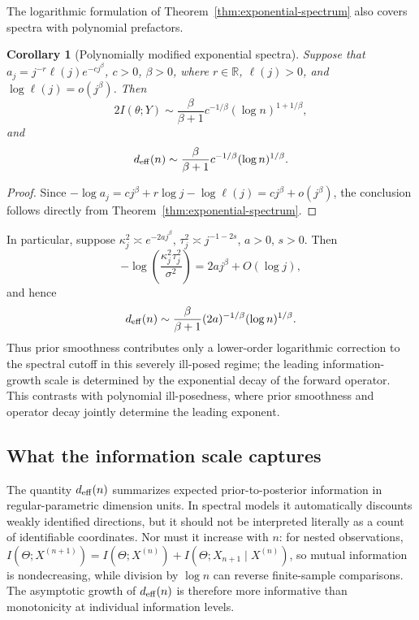\documentclass[11pt]{article}
\theoremstyle{plain}
\newtheorem{corollary}{Corollary}
\theoremstyle{definition}
\theoremstyle{remark}
\begin{document}
The logarithmic formulation of Theorem~\ref{thm:exponential-spectrum} also covers spectra with polynomial prefactors.

\begin{corollary}[Polynomially modified exponential spectra]
	\label{cor:poly-exponential}
	Suppose that \(a_j=j^{-r}\ell(j)e^{-cj^\beta}\), \(c>0\), \(\beta>0\), where \(r\in\mathbb R\), \(\ell(j)>0\), and \(\log\ell(j)=o(j^\beta)\). Then
	\[
	2I(\theta;Y)
	\sim
	\frac{\beta}{\beta+1}c^{-1/\beta}(\log n)^{1+1/\beta},
	\]
	and
	\[
	d_{\rm eff}(n)
	\sim
	\frac{\beta}{\beta+1}c^{-1/\beta}(\log n)^{1/\beta}.
	\]
\end{corollary}

\begin{proof}
	Since \(-\log a_j=cj^\beta+r\log j-\log\ell(j)=cj^\beta+o(j^\beta)\), the conclusion follows directly from Theorem~\ref{thm:exponential-spectrum}.
\end{proof}

In particular, suppose \(\kappa_j^2\asymp e^{-2aj^\beta}\), \(\tau_j^2\asymp j^{-1-2s}\), \(a>0\), \(s>0\). Then
\[
-\log\left(\frac{\kappa_j^2\tau_j^2}{\sigma^2}\right)
=
2aj^\beta+O(\log j),
\]
and hence
\[
d_{\rm eff}(n)
\sim
\frac{\beta}{\beta+1}(2a)^{-1/\beta}(\log n)^{1/\beta}.
\]
Thus prior smoothness contributes only a lower-order logarithmic correction to the spectral cutoff in this severely ill-posed regime; the leading information-growth scale is determined by the exponential decay of the forward operator. This contrasts with polynomial ill-posedness, where prior smoothness and operator decay jointly determine the leading exponent.

\subsection{What the information scale captures}
\label{subsec:interpretation}

The quantity \(d_{\rm eff}(n)\) summarizes expected prior-to-posterior information in regular-parametric dimension units. In spectral models it automatically discounts weakly identified directions, but it should not be interpreted literally as a count of identifiable coordinates. Nor must it increase with \(n\): for nested observations, \(I(\Theta;X^{(n+1)})=I(\Theta;X^{(n)})+I(\Theta;X_{n+1}\mid X^{(n)})\), so mutual information is nondecreasing, while division by \(\log n\) can reverse finite-sample comparisons. The asymptotic growth of \(d_{\rm eff}(n)\) is therefore more informative than monotonicity at individual information levels.
\end{document}
